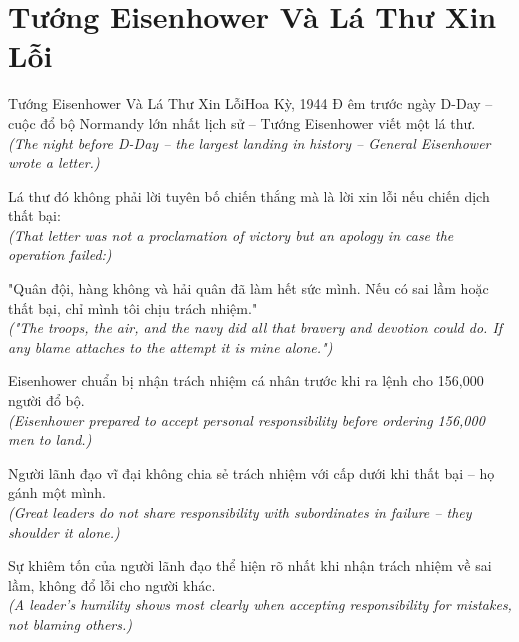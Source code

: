 \section{Tướng Eisenhower Và Lá Thư Xin Lỗi}
\begin{truyen}{Tướng Eisenhower Và Lá Thư Xin Lỗi}{Hoa Kỳ, 1944}
Đ êm trước ngày D-Day -- cuộc đổ bộ Normandy lớn nhất lịch sử -- Tướng Eisenhower viết một lá thư.\\
\textit{(The night before D-Day -- the largest landing in history -- General Eisenhower wrote a letter.)}

Lá thư đó không phải lời tuyên bố chiến thắng mà là lời xin lỗi nếu chiến dịch thất bại:\\
\textit{(That letter was not a proclamation of victory but an apology in case the operation failed:)}

"Quân đội, hàng không và hải quân đã làm hết sức mình. Nếu có sai lầm hoặc thất bại, chỉ mình tôi chịu trách nhiệm."\\
\textit{("The troops, the air, and the navy did all that bravery and devotion could do. If any blame attaches to the attempt it is mine alone.")}

Eisenhower chuẩn bị nhận trách nhiệm cá nhân trước khi ra lệnh cho 156,000 người đổ bộ.\\
\textit{(Eisenhower prepared to accept personal responsibility before ordering 156,000 men to land.)}

Người lãnh đạo vĩ đại không chia sẻ trách nhiệm với cấp dưới khi thất bại -- họ gánh một mình.\\
\textit{(Great leaders do not share responsibility with subordinates in failure -- they shoulder it alone.)}

\end{truyen}
\begin{baihoc}
  Sự khiêm tốn của người lãnh đạo thể hiện rõ nhất khi nhận trách nhiệm về sai lầm, không đổ lỗi cho người khác.\\
  \textit{(A leader's humility shows most clearly when accepting responsibility for mistakes, not blaming others.)}
\end{baihoc}

